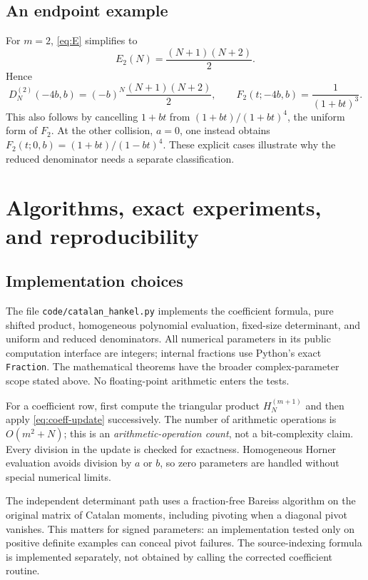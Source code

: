 \documentclass[11pt,a4paper]{article}
\numberwithin{equation}{section}
\theoremstyle{definition}
\theoremstyle{remark}
\newcommand{\D}[2]{D_{#1}^{(#2)}}
\begin{document}
\subsection{An endpoint example}
For $m=2$, \eqref{eq:E} simplifies to
\[
 E_2(N)=\frac{(N+1)(N+2)}2.
\]
Hence
\begin{equation}\label{eq:endpointexample}
 \D{N}{2}(-4b,b)=(-b)^N\frac{(N+1)(N+2)}2,
 \qquad F_2(t;-4b,b)=\frac1{(1+bt)^3}.
\end{equation}
This also follows by cancelling $1+bt$ from
$(1+bt)/(1+bt)^4$, the uniform form of $F_2$.
At the other collision, $a=0$, one instead obtains
$F_2(t;0,b)=(1+bt)/(1-bt)^4$.  These explicit cases illustrate why the
reduced denominator needs a separate classification.

\section{Algorithms, exact experiments, and reproducibility}\label{sec:code}

\subsection{Implementation choices}
The file \texttt{code/catalan\_hankel.py} implements the coefficient
formula, pure shifted product, homogeneous polynomial evaluation,
fixed-size determinant, and uniform and reduced denominators.  All
numerical parameters in its public computation interface are integers;
internal fractions use Python's exact \texttt{Fraction}.  The
mathematical theorems have the broader complex-parameter scope stated
above.  No floating-point arithmetic enters the tests.

For a coefficient row, first compute the triangular product
$H_N^{(m+1)}$ and then apply \eqref{eq:coeff-update} successively.
The number of arithmetic operations is $O(m^2+N)$; this is an
\emph{arithmetic-operation count}, not a bit-complexity claim.
Every division in the update is checked for exactness.  Homogeneous
Horner evaluation avoids division by $a$ or $b$, so zero parameters
are handled without special numerical limits.

The independent determinant path uses a fraction-free Bareiss algorithm
on the original matrix of Catalan moments, including pivoting when a
diagonal pivot vanishes.  This matters for signed parameters: an
implementation tested only on positive definite examples can conceal
pivot failures.  The source-indexing formula is implemented separately,
not obtained by calling the corrected coefficient routine.
\end{document}
